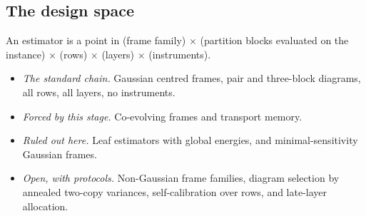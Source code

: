 \subsection{The design space}
An estimator is a point in (frame family) $\times$ (partition blocks evaluated on the instance) $\times$ (rows) $\times$ (layers) $\times$ (instruments).
\begin{itemize}[leftmargin=*]
\item \emph{The standard chain.} Gaussian centred frames, pair and three-block diagrams, all rows, all layers, no instruments.
\item \emph{Forced by this stage.} Co-evolving frames and transport memory.
\item \emph{Ruled out here.} Leaf estimators with global energies, and minimal-sensitivity Gaussian frames.
\item \emph{Open, with protocols.} Non-Gaussian frame families, diagram selection by annealed two-copy variances,
self-calibration over rows, and late-layer allocation.
\end{itemize}
